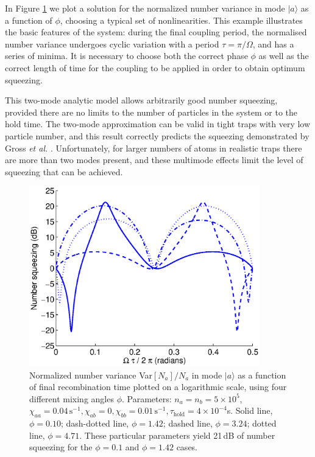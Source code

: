 \documentclass{iopart}
\begin{document}

In Figure \ref{figTwoModeAnalyticExamples} we plot a solution for the normalized number variance in mode $|a\rangle$ as a function of $\phi$, choosing a typical set of nonlinearities. This example illustrates the basic features of the system: during the final coupling period, the normalised number variance undergoes cyclic variation with a period $\tau=\pi / \Omega$, and has a series of minima. It is necessary to choose both the correct phase $\phi$ as well as the correct length of time for the coupling to be applied in order to obtain optimum squeezing.

This two-mode analytic model allows arbitrarily good number squeezing, provided there are no limits to the number of particles in the system or to the hold time. The two-mode approximation can be valid in tight traps with very low particle number, and this result correctly predicts the squeezing demonstrated by Gross \textit{et al.} \cite{gross2010}. Unfortunately, for larger numbers of atoms in realistic traps there are more than two modes present, and these multimode effects limit the level of squeezing that can be achieved.

\begin{figure}
    \centering
    \includegraphics[width=10cm]{figures/analytic_two_mode_examples.eps}
    \caption{Normalized number variance Var$[N_a]/N_a$ in mode $|a \rangle$ as a function of final recombination time plotted on a logarithmic scale, using four different mixing angles $\phi$. Parameters: $n_a = n_b =5 \times 10^5$, $\chi_{aa}=0.04\, \text{s}^{-1}, \chi_{ab}=0, \chi_{bb}=0.01\,\text{s}^{-1}, \tau_{\mathrm{hold}}=4\times 10^{-4}$s. Solid line, $\phi=0.10$; dash-dotted line, $\phi=1.42$; dashed line, $\phi=3.24$; dotted line, $\phi=4.71$. These particular parameters yield 21\,dB of number squeezing for the $\phi=0.1$ and $\phi=1.42$ cases.} 
    \label{figTwoModeAnalyticExamples}
\end{figure}
\end{document}
